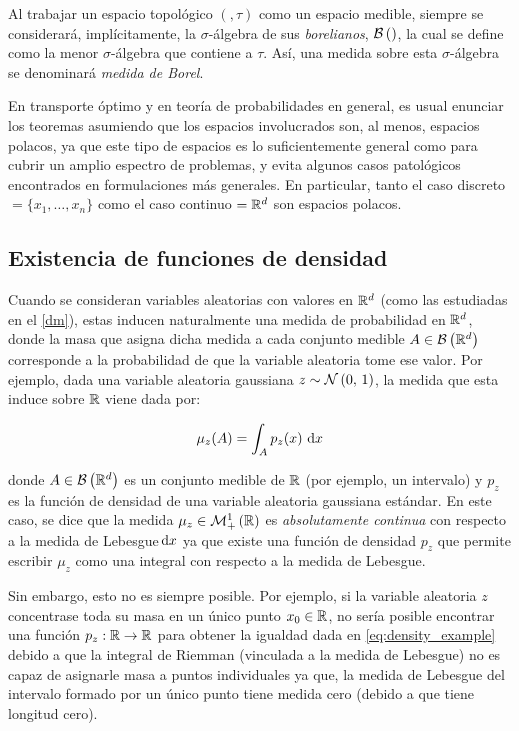 Al trabajar un espacio topológico $(\xspace,\tau)$ como un espacio medible, siempre se considerará, implícitamente, la $\sigma$-álgebra de sus \textit{borelianos}, $\mathcal{B}\left(\right)$, la cual se define como la menor $\sigma$-álgebra que contiene a $\tau$. Así, una medida sobre esta $\sigma$-álgebra se denominará \textit{medida de Borel}.

En transporte óptimo y en teoría de probabilidades en general, es usual enunciar los teoremas asumiendo que los espacios involucrados son, al menos, espacios polacos, ya que este tipo de espacios es lo suficientemente general como para cubrir un amplio espectro de problemas, y evita algunos casos patológicos encontrados en formulaciones más generales. En particular, tanto el caso discreto $\xspace=\{x_1,\ldots,x_n\}$ como el caso continuo $=\mathbb{R}^d$ son espacios polacos.

\subsection{Existencia de funciones de densidad}
\label{measure_theory/density}

Cuando se consideran variables aleatorias con valores en $\mathbb{R}^d$ (como las estudiadas en el \autoref{dm}), estas inducen naturalmente una medida de probabilidad en $\mathbb{R}^d$, donde la masa que asigna dicha medida a cada conjunto medible $A\in\mathcal{B}\left(\mathbb{R}^d\right)$ corresponde a la probabilidad de que la variable aleatoria tome ese valor. Por ejemplo, dada una variable aleatoria gaussiana $z\sim\mathcal{N}\left(0,\,1\right)$, la medida que esta induce sobre $\mathbb{R}$ viene dada por:

\begin{equation}
    \label{eq:density_example}
    \mu_z(A) = \int_A p_z(x) \,\operatorname{d}\! x
\end{equation}

donde $A\in\mathcal{B}\left(\mathbb{R}^d\right)$ es un conjunto medible de $\mathbb{R}$ (por ejemplo, un intervalo) y $p_z$ es la función de densidad de una variable aleatoria gaussiana estándar. En este caso, se dice que la medida $\mu_z\in\mathcal{M}_+^1\left(\mathbb{R}\right)$ es \textit{absolutamente continua} con respecto a la medida de Lebesgue$\,\operatorname{d}\! x$ ya que existe una función de densidad $p_z$ que permite escribir $\mu_z$ como una integral con respecto a la medida de Lebesgue.

Sin embargo, esto no es siempre posible. Por ejemplo, si la variable aleatoria $z$ concentrase toda su masa en un único punto $x_0\in\mathbb{R}$, no sería posible encontrar una función $p_z:\mathbb{R}\to\mathbb{R}$ para obtener la igualdad dada en \eqref{eq:density_example} debido a que la integral de Riemman (vinculada a la medida de Lebesgue) no es capaz de asignarle masa a puntos individuales ya que, la medida de Lebesgue del intervalo formado por un único punto tiene medida cero (debido a que tiene longitud cero).

